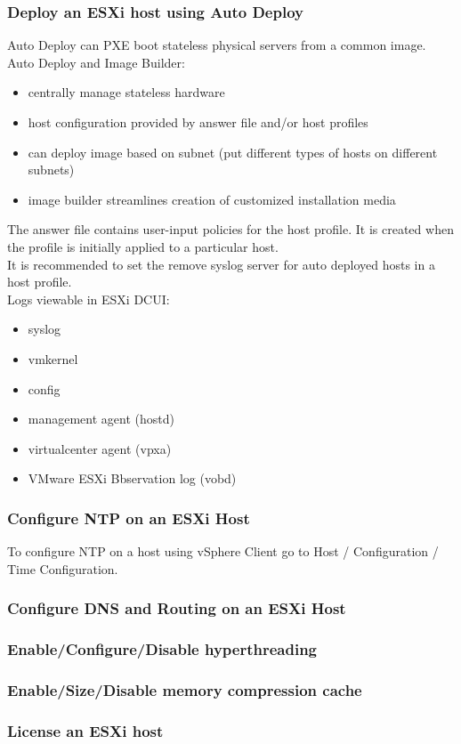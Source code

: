 \subsubsection{Deploy an ESXi host using Auto Deploy}

Auto Deploy can PXE boot stateless physical servers from a common image.\\

Auto Deploy and Image Builder:

\begin{itemize}
\item centrally manage stateless hardware
\item host configuration provided by answer file and/or host profiles
\item can deploy image based on subnet (put different types of hosts on
different subnets)
\item image builder streamlines creation of customized installation media
\end{itemize}

The answer file contains user-input policies for the host profile. It is
created when the profile is initially applied to a particular host.\\

It is recommended to set the remove syslog server for auto deployed hosts
in a host profile.\\

Logs viewable in ESXi DCUI:

\begin{itemize}
\item syslog
\item vmkernel
\item config
\item management agent (hostd)
\item virtualcenter agent (vpxa)
\item VMware ESXi Bbservation log (vobd)
\end{itemize}

\subsubsection{Configure NTP on an ESXi Host}

To configure NTP on a host using vSphere Client go to Host / Configuration /
Time Configuration.

\subsubsection{Configure DNS and Routing on an ESXi Host}

\subsubsection{Enable/Configure/Disable hyperthreading}

\subsubsection{Enable/Size/Disable memory compression cache}

\subsubsection{License an ESXi host}
